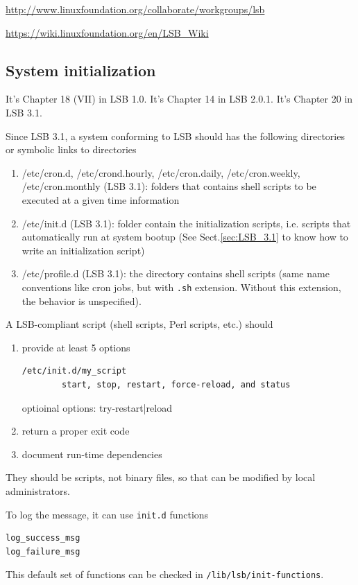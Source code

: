 \url{http://www.linuxfoundation.org/collaborate/workgroups/lsb}

\url{https://wiki.linuxfoundation.org/en/LSB_Wiki}


\subsection{System initialization}
\label{sec:LSB_system-initialization}

It's Chapter 18 (VII) in LSB 1.0. It's Chapter 14 in LSB 2.0.1. It's Chapter 20
in LSB 3.1.

Since LSB 3.1, a system conforming to LSB should has the following directories
or symbolic links to directories
\begin{enumerate}
  \item /etc/cron.d, /etc/crond.hourly, /etc/cron.daily,
  /etc/cron.weekly, /etc/cron.monthly (LSB 3.1):  folders that contains shell
  scripts to be executed at a given time information
  
  \item /etc/init.d (LSB 3.1): folder contain the initialization scripts, i.e.
  scripts that automatically run at system bootup (See Sect.\ref{sec:LSB_3.1}
  to know how to write an initialization script)
  
  \item /etc/profile.d (LSB 3.1): the directory contains shell scripts (same
  name conventions like cron jobs, but with \verb!.sh! extension. Without this
  extension, the behavior is unspecified).
\end{enumerate}

A LSB-compliant script (shell scripts, Perl scripts, etc.) should 
\begin{enumerate}
  \item provide at least 5 options

\begin{verbatim}
/etc/init.d/my_script 
        start, stop, restart, force-reload, and status
\end{verbatim}
optioinal options: try-restart|reload

  \item return a proper exit code
  \item document run-time dependencies
\end{enumerate}
They should be scripts, not binary files, so that can be modified by local
administrators.

To log the message, it can use \verb!init.d! functions
\begin{verbatim}
log_success_msg
log_failure_msg
\end{verbatim}
This default set of functions can be checked in \verb!/lib/lsb/init-functions!. 

